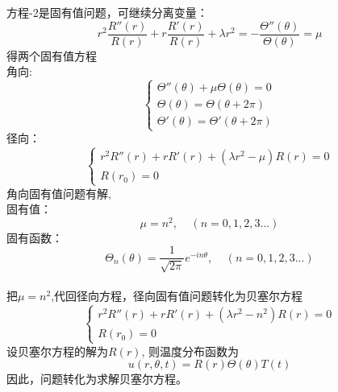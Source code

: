 	方程-2是固有值问题，可继续分离变量：	
	\begin{equation*}
		r^2 \frac{R'' (r)}{R(r)}+r \frac{R'(r)}{R(r)} + \lambda r^2 =-\frac{\Theta ''(\theta)} {\Theta (\theta)} =\mu  
	\end{equation*}
	得两个固有值方程 \\
	角向:
	$$ \begin{cases}
		\Theta ''(\theta)+\mu \Theta (\theta) =0 \\
		\Theta (\theta) =	\Theta (\theta+2\pi)  \\
		\Theta' (\theta) =	\Theta' (\theta+2\pi)  
	\end{cases} $$	
	径向：
	$$ \begin{cases}
		r^2 R'' (r)+r R'(r) +( \lambda r^2 -\mu)R(r)=0  \\
		R(r_0)=0
	\end{cases} $$	
	角向固有值问题有解,\\
	固有值：
	\begin{equation*}
		\mu=n^2, ~~~~~(n=0,1,2,3...)
	\end{equation*}
	固有函数：
	\begin{equation*}
		\Theta_n(\theta) = \frac{1}{\sqrt{2\pi}} e^{-i n \theta }, ~~~~~(n=0,1,2,3...)
	\end{equation*}
	~\\
	把$\mu=n^2$,代回径向方程，径向固有值问题转化为贝塞尔方程
	\begin{equation} 
		\boxed{ \begin{cases}
		r^2 R'' (r)+r R'(r) +( \lambda r^2 -n^2)R(r)=0  \\
		R(r_0)=0
	\end{cases} }
    \end{equation}	
	设贝塞尔方程的解为$R(r)$, 则温度分布函数为
	$$u(r,\theta,t) =R(r)\Theta(\theta)T(t)$$	
	因此，问题转化为求解贝塞尔方程。

~~\\ 

